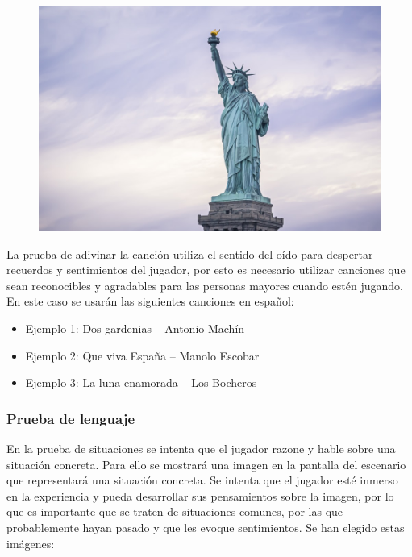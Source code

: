 \begin{figure}[H]
\begin{minipage}{.3\textwidth}
  \centering
  \includegraphics[width=.9\linewidth]{04.Desarrollo/04.Entrega4/01.Iteracion4_1/00.Figuras/03.libertad.jpg}
  \label{fig:E4_estatuaLibertad}
\end{minipage}
\end{figure}



La prueba de adivinar la canción utiliza el sentido del oído para despertar recuerdos y sentimientos del jugador, por esto es necesario utilizar canciones que sean reconocibles y agradables para las personas mayores cuando estén jugando. En este caso se usarán las siguientes canciones en español:

\begin{itemize}
    \item {Ejemplo 1: Dos gardenias – Antonio Machín}
    \item {Ejemplo 2: Que viva España – Manolo Escobar}
    \item {Ejemplo 3: La luna enamorada – Los Bocheros}
\end{itemize}

\subsubsection{Prueba de lenguaje}

En la prueba de situaciones se intenta que el jugador razone y hable sobre una situación concreta. Para ello se mostrará una imagen en la pantalla del escenario que representará una situación concreta. Se intenta que el jugador esté inmerso en la experiencia y pueda desarrollar sus pensamientos sobre la imagen, por lo que es importante que se traten de situaciones comunes, por las que probablemente hayan pasado y que les evoque sentimientos. Se han elegido estas imágenes:

